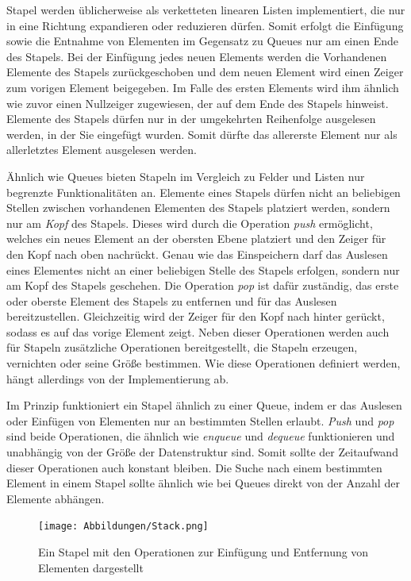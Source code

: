Stapel werden üblicherweise als verketteten linearen Listen implementiert, die nur in eine Richtung expandieren oder reduzieren dürfen. Somit erfolgt die Einfügung sowie die Entnahme von Elementen im Gegensatz zu Queues nur am einen Ende des Stapels. Bei der Einfügung jedes neuen Elements werden die Vorhandenen Elemente des Stapels zurückgeschoben und dem neuen Element wird einen Zeiger zum vorigen Element beigegeben. Im Falle des ersten Elements wird ihm ähnlich wie zuvor einen Nullzeiger zugewiesen, der auf dem Ende des Stapels hinweist. Elemente des Stapels dürfen nur in der umgekehrten Reihenfolge ausgelesen werden, in der Sie eingefügt wurden. Somit dürfte das allererste Element nur als allerletztes Element ausgelesen werden. \autocite[363]{gumm_band_2016}

Ähnlich wie Queues bieten Stapeln im Vergleich zu Felder und Listen nur begrenzte Funktionalitäten an. Elemente eines Stapels dürfen nicht an beliebigen Stellen zwischen vorhandenen Elementen des Stapels platziert werden, sondern nur am \textit{Kopf} des Stapels. Dieses wird durch die Operation \textit{push} ermöglicht, welches ein neues Element an der obersten Ebene platziert und den Zeiger für den Kopf nach oben nachrückt. Genau wie das Einspeichern darf das Auslesen eines Elementes nicht an einer beliebigen Stelle des Stapels erfolgen, sondern nur am Kopf des Stapels geschehen. Die Operation \textit{pop} ist dafür zuständig, das erste oder oberste Element des Stapels zu entfernen und für das Auslesen bereitzustellen. Gleichzeitig wird der Zeiger für den Kopf nach hinter gerückt, sodass es auf das vorige Element zeigt. Neben dieser Operationen werden auch für Stapeln zusätzliche Operationen bereitgestellt, die Stapeln erzeugen, vernichten oder seine Größe bestimmen. Wie diese Operationen definiert werden, hängt allerdings von der Implementierung ab. \autocite[614]{ernst_grundkurs_2020} \autocite[45-46]{ollmert_datenstrukturen_2020}

Im Prinzip funktioniert ein Stapel ähnlich zu einer Queue, indem er das Auslesen oder Einfügen von Elementen nur an bestimmten Stellen erlaubt. \textit{Push} und \textit{pop} sind beide Operationen, die ähnlich wie \textit{enqueue} und \textit{dequeue} funktionieren und unabhängig von der Größe der Datenstruktur sind. Somit sollte der Zeitaufwand dieser Operationen auch konstant bleiben. Die Suche nach einem bestimmten Element in einem Stapel sollte ähnlich wie bei Queues direkt von der Anzahl der Elemente abhängen.

\begin{figure}[t]
	\texttt{[image: Abbildungen/Stack.png]}
	\centering
	\caption[Stapel]{Ein Stapel mit den Operationen zur Einfügung und Entfernung von Elementen dargestellt \autocite[371]{gumm_band_2016}}
	\label{fig: stack}
\end{figure}

